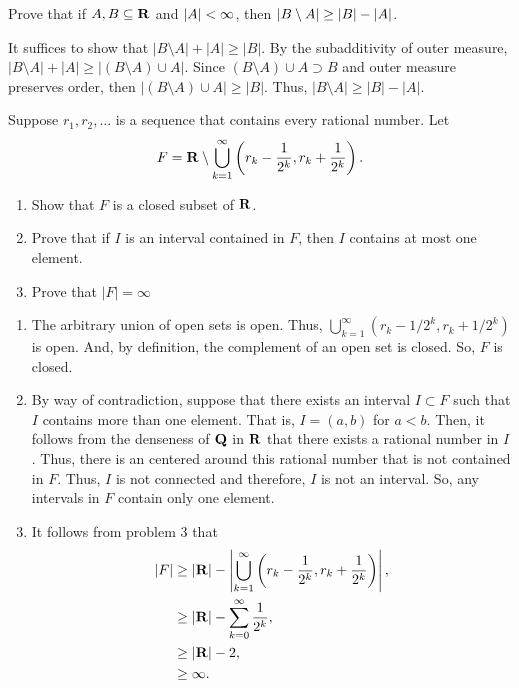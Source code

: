 \documentclass[11pt,oneside]{book}
\begin{document}
\begin{exercise}
    Prove that if $A, B \subseteq \mathbf{R}$ and $\lvert A\rvert < \infty$, then $\lvert B \setminus A\rvert \geq \lvert B\rvert - \lvert A\rvert$.
\end{exercise}
\begin{solution}
    It suffices to show that $|B\setminus A| + |A| \geq |B|$. By the
    subadditivity of outer measure, $|B\setminus A| + |A| \geq |(B\setminus A)
    \cup A|$. Since $(B \setminus A)\cup A \supset B$ and outer measure
    preserves order, then $|(B\setminus A) \cup A| \geq |B|$. Thus, $|B\setminus
    A| \geq |B| - |A|$. 
\end{solution}

\begin{exercise}
    Suppose $r_1, r_2,\ldots$ is a sequence that contains every rational number. Let 
    \[
    F = \mathbf{R} \setminus \bigcup_{k=1}^\infty \left(r_k - \frac{1}{2^k}, r_k + \frac{1}{2^k}\right).
    \]
    \begin{enumerate}[label=(\alph*)]
        \item Show that $F$ is a closed subset of $\mathbf{R}$.
        \item Prove that if $I$ is an interval contained in $F$, then $I$ contains at most one element. 
        \item Prove that $|F| = \infty$
    \end{enumerate}
\end{exercise}
\begin{solution}
    \begin{enumerate}[label=(\alph*)]
        \item The arbitrary union of open sets is open. Thus,
        $\bigcup_{k=1}^\infty (r_k - 1/2^k, r_k + 1/2^k)$ is open. And, by
        definition, the complement of an open set is closed. So, $F$ is closed. 
        \item By way of contradiction, suppose that there exists an interval $I
        \subset F$ such that $I$ contains more than one element. That is, $I =
        (a,b)$ for $a < b$. Then, it follows from the denseness of $\mathbf{Q}$ in $\mathbf{R}$
        that there exists a rational number in $I$. Thus, there is an centered
        around this rational number that is not contained in $F$. Thus, $I$ is
        not connected and therefore, $I$ is not an interval. So, any intervals
        in $F$ contain only one element. 
        \item It follows from problem 3 that 
        \begin{align*}
            |F| &\geq |\mathbf{R}| - \left|\bigcup_{k=1}^\infty \left(r_k - \frac{1}{2^k}, r_k + \frac{1}{2^k}\right)\right|, \\
            &\geq |\mathbf{R}| - \sum_{k=0}^\infty \frac{1}{2^k}, \\
            &\geq |\mathbf{R}| - 2, \\
            &\geq \infty.
        \end{align*}
    \end{enumerate}
\end{solution}
\end{document}
